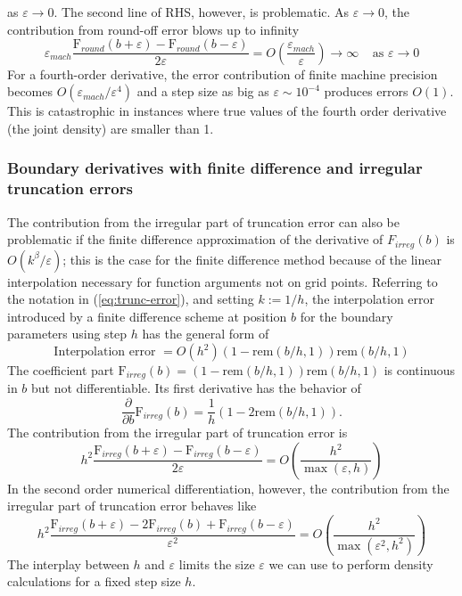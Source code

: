 as $\varepsilon \rightarrow 0$.  The second line of RHS, however, is
problematic. As $\varepsilon \rightarrow 0$, the contribution from
round-off error blows up to infinity
\[
  \varepsilon_{mach}
  \frac{\mbox{F}_{round}(b+\varepsilon)-\mbox{F}_{round}(b-\varepsilon)}{2
    \varepsilon} = O\left(\frac{\varepsilon_{mach}}{\varepsilon}
  \right) \longrightarrow \infty \;\;\;\; \mbox{as } \varepsilon
  \rightarrow 0
\]
For a fourth-order derivative, the error contribution of finite
machine precision becomes $O(\varepsilon_{mach}/\varepsilon^4)$ and a
step size as big as $\varepsilon \sim 10^{-4}$ produces errors
$O(1)$. This is catastrophic in instances where true values of the
fourth order derivative (the joint density) are smaller than 1.

\subsubsection{Boundary derivatives with finite difference and irregular truncation errors} \nonumber
The contribution from the irregular part of truncation error can also
be problematic if the finite difference approximation of the
derivative of $F_{irreg}(b)$ is $O(k^\beta/\varepsilon)$; this is the
case for the finite difference method because of the linear
interpolation necessary for function arguments not on grid
points. Referring to the notation in (\ref{eq:trunc-error}), and
setting $k := 1/h$, the interpolation error introduced by a finite
difference scheme at position $b$ for the boundary parameters using
step $h$ has the general form of
$$\mbox{Interpolation error } = O(h^2) (1-\mbox{rem}(b/h,1)) \mbox{rem}(b/h,1)$$
The coefficient part
$\mbox{F}_{irreg}(b) = (1-\mbox{rem}(b/h,1)) \mbox{rem}(b/h,1) $ is
continuous in $b$ but not differentiable. Its first derivative has the
behavior of
$$ \frac{\partial }{\partial b} \mbox{F}_{irreg}(b) =  \frac{1}{h} \left(1-2\mbox{rem}(b/h,1) \right).$$ The contribution from the irregular part of truncation error is
$$ h^2 \frac{\mbox{F}_{irreg}(b+\varepsilon)-\mbox{F}_{irreg}(b-\varepsilon)}{2 \varepsilon}  =
O\left(\frac{h^2}{\max(\varepsilon, h)} \right) $$
In the second order numerical differentiation, however, the contribution from
the irregular part of truncation error behaves like
$$ h^2 \frac{\mbox{F}_{irreg}(b+\varepsilon)-2\mbox{F}_{irreg}(b)
  +\mbox{F}_{irreg}(b-\varepsilon)}{\varepsilon^2 } =
O\left(\frac{h^2}{\max(\varepsilon^2, h^2)} \right) $$ The interplay
between $h$ and $\varepsilon$ limits the size $\varepsilon$ we can use
to perform density calculations for a fixed step size $h$.


